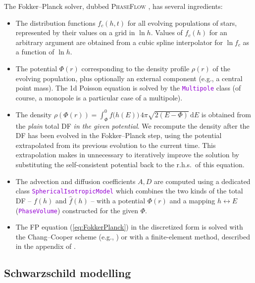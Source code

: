 \documentclass[12pt]{article}
\newcommand{\ttt}[1]{\textcolor{darkviolet}{\texttt{#1}}}
\renewcommand{\d}{\mathrm{d}}
\begin{document}
The Fokker--Planck solver, dubbed \textsc{PhaseFlow} \cite{Vasiliev2017}, has several ingredients:
\begin{itemize}
\item The distribution functions $f_c(h,t)$ for all evolving populations of stars, represented by their values on a grid in $\ln h$. Values of $f_c(h)$ for an arbitrary argument are obtained from a cubic spline interpolator for $\ln f_c$ as a function of $\ln h$.
\item The potential $\Phi(r)$ corresponding to the density profile $\rho(r)$ of the evolving population, plus optionally an external component (e.g., a central point mass). The 1d Poisson equation is solved by the \ttt{Multipole} class (of course, a monopole is a particular case of a multipole).
\item The density $\rho(\Phi(r)) = \int_{\Phi}^0 f\big(h(E)\big)\,4\pi\sqrt{2(E-\Phi)}\,\d E$ is obtained from the \textsl{plain} total DF \textit{in the given potential}. We recompute the density after the DF has been evolved in the Fokker--Planck step, using the potential extrapolated from its previous evolution to the current time. This extrapolation makes in unnecessary to iteratively improve the solution by substituting the self-consistent potential back to the r.h.s.\ of this equation.
\item The advection and diffusion coefficients $A, D$ are computed using a dedicated class \ttt{SphericalIsotropicModel} which combines the two kinds of the total DF -- $f(h)$ and $\widehat f(h)$ -- with a potential $\Phi(r)$ and a mapping $h\leftrightarrow E$ (\ttt{PhaseVolume}) constructed for the given $\Phi$.
\item The FP equation (\ref{eq:FokkerPlanck}) in the discretized form is solved with the Chang--Cooper scheme (e.g., \cite{ParkPetrosian1996}) or with a finite-element method, described in the appendix of \cite{Vasiliev2017}.
\end{itemize}


\subsection{Schwarzschild modelling}  \label{sec:SchwarzschildDetails}
\end{document}
